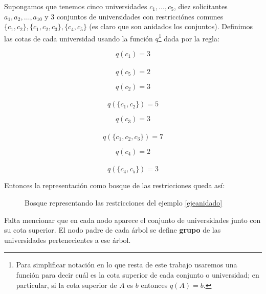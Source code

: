 \begin{eje}\label{ejeanidado}
Supongamos que tenemos cinco universidades $c_1,\dots,c_5$, diez solicitantes $a_1,a_2,\dots,a_{10}$ y 3 conjuntos de universidades con restricciónes comunes $\{c_1,c_2\},\{c_1,c_2,c_3\},\{c_4,c_5\}$ (es claro que son anidados los conjuntos). Definimos las cotas de cada universidad usando la función $q$\footnote{Para simplificar notación en lo que resta de este trabajo usaremos una función para decir cuál es la cota superior de cada conjunto o universidad; en particular, si la cota superior de $A$ es $b$ entonces $q(A)=b$.} dada por la regla:

 \begin{minipage}{.25\linewidth}
$$q(c_1)=3$$ \\
$$q(c_5)=2$$ 
\end{minipage}%
\begin{minipage}{.25\linewidth}
$$q(c_2)=3$$ \\
$$q(\{c_1,c_2\})=5$$ 
\end{minipage}
\begin{minipage}{.25\linewidth}
$$q(c_3)=3$$ \\
$$q(\{c_1,c_2,c_3\})=7$$ 
\end{minipage}
\begin{minipage}{.25\linewidth}
$$q(c_4)=2$$ \\
$$q(\{c_4,c_5\})=3$$ 
\end{minipage}

Entonces la representación como bosque de las restricciones queda así:

\begin{figure}[H]
\noindent \begin{minipage}{.5\linewidth}
\centering
{}
\end{minipage}%
 \begin{minipage}{.5\linewidth}
\centering
{}
\end{minipage}%
\caption{Bosque representando las restricciones del ejemplo \ref{ejeanidado}}
\end{figure}
Falta mencionar que en cada nodo aparece el conjunto de universidades junto con su cota superior. El nodo padre de cada árbol se define \textbf{grupo} de las universidades pertenecientes a ese árbol.

\fin
\end{eje}

